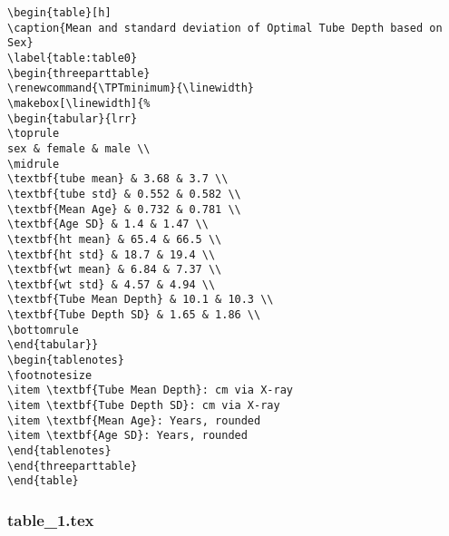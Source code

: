 \documentclass[11pt]{article}
\begin{document}
\begin{Verbatim}[tabsize=4]
\begin{table}[h]
\caption{Mean and standard deviation of Optimal Tube Depth based on Sex}
\label{table:table0}
\begin{threeparttable}
\renewcommand{\TPTminimum}{\linewidth}
\makebox[\linewidth]{%
\begin{tabular}{lrr}
\toprule
sex & female & male \\
\midrule
\textbf{tube mean} & 3.68 & 3.7 \\
\textbf{tube std} & 0.552 & 0.582 \\
\textbf{Mean Age} & 0.732 & 0.781 \\
\textbf{Age SD} & 1.4 & 1.47 \\
\textbf{ht mean} & 65.4 & 66.5 \\
\textbf{ht std} & 18.7 & 19.4 \\
\textbf{wt mean} & 6.84 & 7.37 \\
\textbf{wt std} & 4.57 & 4.94 \\
\textbf{Tube Mean Depth} & 10.1 & 10.3 \\
\textbf{Tube Depth SD} & 1.65 & 1.86 \\
\bottomrule
\end{tabular}}
\begin{tablenotes}
\footnotesize
\item \textbf{Tube Mean Depth}: cm via X-ray
\item \textbf{Tube Depth SD}: cm via X-ray
\item \textbf{Mean Age}: Years, rounded
\item \textbf{Age SD}: Years, rounded
\end{tablenotes}
\end{threeparttable}
\end{table}

\end{Verbatim}

\subsubsection*{table\_1.tex}
\end{document}

